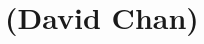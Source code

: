 \renewcommand{\thespeaker}{David Chan}
\renewcommand{\thetitle}{}
\section{\thetitle~(\thespeaker)}


